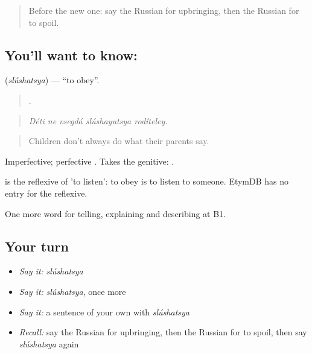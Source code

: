 \label{lesson:RU-C497-slushatsya}



\begin{quote}
Before the new one: say the Russian for upbringing, then the Russian for to spoil.
\end{quote}

\subsection*{You'll want to know: }
\textbf{} (\emph{slúshatsya}) — \textquotedblleft{}to obey\textquotedblright{}.

\begin{quote}
    .
\end{quote}

\begin{quote}
\emph{Déti ne vsegdá slúshayutsya rodíteley.}
\end{quote}

\begin{quote}
Children don't always do what their parents say.
\end{quote}

Imperfective; perfective . Takes the genitive: \emph{ }.

\begin{cousinweb}
\emph{} is the reflexive of \emph{} 'to listen': to obey is to listen to someone. EtymDB has no entry for the reflexive.
\end{cousinweb}

\begin{grammarlens}[title={What you've built}]
One more word for telling, explaining and describing at B1.
\end{grammarlens}

\subsection*{Your turn}
\begin{itemize}
\raggedright
  \item \emph{Say it:} \emph{slúshatsya}
  \item \emph{Say it:} \emph{slúshatsya}, once more
  \item \emph{Say it:} a sentence of your own with \emph{slúshatsya}
  \item \emph{Recall:} say the Russian for upbringing, then the Russian for to spoil, then say \emph{slúshatsya} again
\end{itemize}

